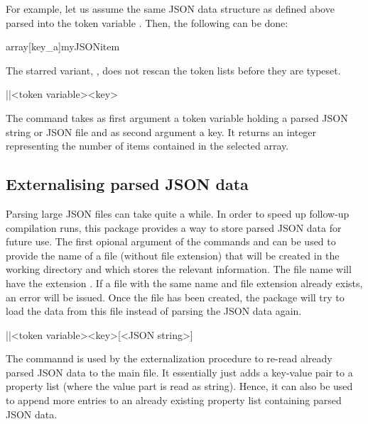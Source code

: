 \documentclass[a4paper]{article}
\begin{document}
{{For example, let us assume the same JSON data structure as defined above parsed into the token variable \macro{\myJSONdata}. Then, the following can be done:


\begin{codeexamplecolumns}
\newcommand{\myJSONitem}{
  \item \emph{\JSONParseArrayValue}
}

\begin{itemize}
  \JSONParseArrayValuesMap{\myJSONdata}
    {array}[key_a]{myJSONitem}
\end{itemize}
\end{codeexamplecolumns}

The starred variant, \macro{\JSONParseArrayValuesMap*}, does not rescan the token lists before they are typeset. 

\begin{macrodef}
|\JSONParseArrayCount|{<token variable>}{<key>}
\end{macrodef}
The command \macro{\JSONParseArrayCount} takes as first argument a token variable holding a parsed JSON string or JSON file and as second argument a key. It returns an integer representing the number of items contained in the selected array.

\subsection{Externalising parsed JSON data}\label{sec:externalizing}

Parsing large JSON files can take quite a while. In order to speed up follow-up compilation runs, this package provides a way to store parsed JSON data for future use. The first opional argument of the commands \macro{\JSONParse} and \macro{\JSONParseFromFile} can be used to provide the name of a file (without file extension) that will be created in the working directory and which stores the relevant information. The file name will have the extension . If a file with the same name and file extension already exists, an error will be issued. Once the file has been created, the package will try to load the data from this file instead of parsing the JSON data again. 

\begin{macrodef}
|\JSONParsePut|{<token variable>}{<key>}[<JSON string>]
\end{macrodef}
The commannd \macro{\JSONParsePut} is used by the externalization procedure to re-read already parsed JSON data to the main file. It essentially just adds a key-value pair to a property list (where the value part is read as string). Hence, it can also be used to append more entries to an already existing property list containing parsed JSON data.

}}
\end{document}
